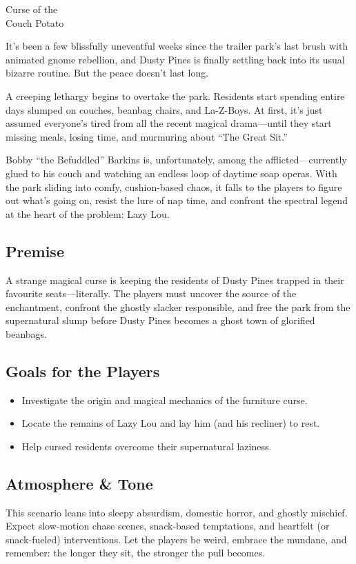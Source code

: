 \begin{WyrdScenarioHeading}{Curse of the\\ Couch Potato}
    \label{scenario:curse-couch-potato}

    It’s been a few blissfully uneventful weeks since the trailer park's last brush with animated gnome rebellion, and Dusty Pines is finally settling back into its usual bizarre routine. But the peace doesn’t last long.

    A creeping lethargy begins to overtake the park. Residents start spending entire days slumped on couches, beanbag chairs, and La-Z-Boys. At first, it’s just assumed everyone’s tired from all the recent magical drama—until they start missing meals, losing time, and murmuring about “The Great Sit.”

    Bobby “the Befuddled” Barkins is, unfortunately, among the afflicted—currently glued to his couch and watching an endless loop of daytime soap operas. With the park sliding into comfy, cushion-based chaos, it falls to the players to figure out what’s going on, resist the lure of nap time, and confront the spectral legend at the heart of the problem: Lazy Lou.

    \subsection*{Premise}
    A strange magical curse is keeping the residents of Dusty Pines trapped in their favourite seats—literally. The players must uncover the source of the enchantment, confront the ghostly slacker responsible, and free the park from the supernatural slump before Dusty Pines becomes a ghost town of glorified beanbags.

    \subsection*{Goals for the Players}
    \begin{itemize}
        \item Investigate the origin and magical mechanics of the furniture curse.
        \item Locate the remains of Lazy Lou and lay him (and his recliner) to rest.
        \item Help cursed residents overcome their supernatural laziness.
    \end{itemize}

    \subsection*{Atmosphere \& Tone}
    This scenario leans into sleepy absurdism, domestic horror, and ghostly mischief. Expect slow-motion chase scenes, snack-based temptations, and heartfelt (or snack-fueled) interventions. Let the players be weird, embrace the mundane, and remember: the longer they sit, the stronger the pull becomes.

\end{WyrdScenarioHeading}


